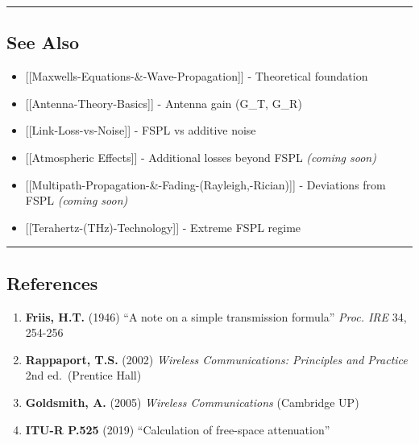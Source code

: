 \begin{center}\rule{0.5\linewidth}{0.5pt}\end{center}

\subsection{\texorpdfstring{ See Also}{ See Also}}\label{see-also}

\begin{itemize}
\tightlist
\item
  {[}{[}Maxwell\textquotesingle s-Equations-\&-Wave-Propagation{]}{]} -
  Theoretical foundation
\item
  {[}{[}Antenna-Theory-Basics{]}{]} - Antenna gain (G\_T, G\_R)
\item
  {[}{[}Link-Loss-vs-Noise{]}{]} - FSPL vs additive noise
\item
  {[}{[}Atmospheric Effects{]}{]} - Additional losses beyond FSPL
  \emph{(coming soon)}
\item
  {[}{[}Multipath-Propagation-\&-Fading-(Rayleigh,-Rician){]}{]} -
  Deviations from FSPL \emph{(coming soon)}
\item
  {[}{[}Terahertz-(THz)-Technology{]}{]} - Extreme FSPL regime
\end{itemize}

\begin{center}\rule{0.5\linewidth}{0.5pt}\end{center}

\subsection{\texorpdfstring{ References}{ References}}\label{references}

\begin{enumerate}
\def\labelenumi{\arabic{enumi}.}
\tightlist
\item
  \textbf{Friis, H.T.} (1946) ``A note on a simple transmission
  formula'' \emph{Proc. IRE} 34, 254-256
\item
  \textbf{Rappaport, T.S.} (2002) \emph{Wireless Communications:
  Principles and Practice} 2nd ed.~(Prentice Hall)
\item
  \textbf{Goldsmith, A.} (2005) \emph{Wireless Communications}
  (Cambridge UP)
\item
  \textbf{ITU-R P.525} (2019) ``Calculation of free-space attenuation''
\end{enumerate}
